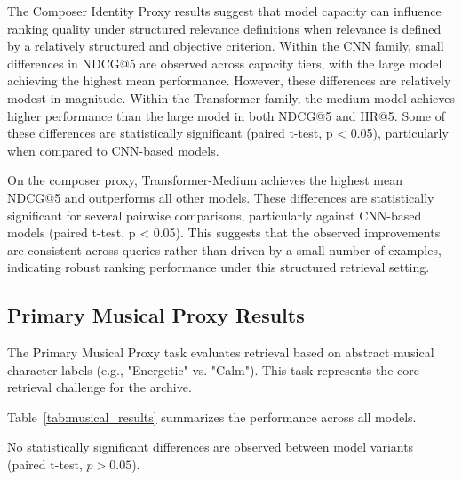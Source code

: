 \documentclass[sigconf]{acmart}
\begin{document}
The Composer Identity Proxy results suggest that model capacity can influence ranking quality under structured relevance definitions when relevance is defined by a relatively structured and objective criterion. Within the CNN family, small differences in NDCG@5 are observed across capacity tiers, with the large model achieving the highest mean performance. However, these differences are relatively modest in magnitude. Within the Transformer family, the medium model achieves higher performance than the large model in both NDCG@5 and HR@5. Some of these differences are statistically significant (paired t-test, p < 0.05), particularly when compared to CNN-based models.

On the composer proxy, Transformer-Medium achieves the highest mean NDCG@5 and outperforms all other models. These differences are statistically significant for several pairwise comparisons, particularly against CNN-based models (paired t-test, p < 0.05). This suggests that the observed improvements are consistent across queries rather than driven by a small number of examples, indicating robust ranking performance under this structured retrieval setting.

\subsection{Primary Musical Proxy Results}
The Primary Musical Proxy task evaluates retrieval based on abstract musical character labels (e.g., "Energetic" vs. "Calm"). This task represents the core retrieval challenge for the archive.

Table~\ref{tab:musical_results} summarizes the performance across all models.

\begin{table}[!htbp]
\centering
\caption{Primary Musical Proxy Results (Character Retrieval). Metrics reported are corpus-level mean values at rank 5 and rank 10, including NDCG@K and Hit Rate@K (HR@K).}
\label{tab:musical_results}
\vspace{2pt}
\raggedright
\footnotesize{
No statistically significant differences are observed between model variants (paired t-test, $p > 0.05$).
}
\end{table}
\end{document}
